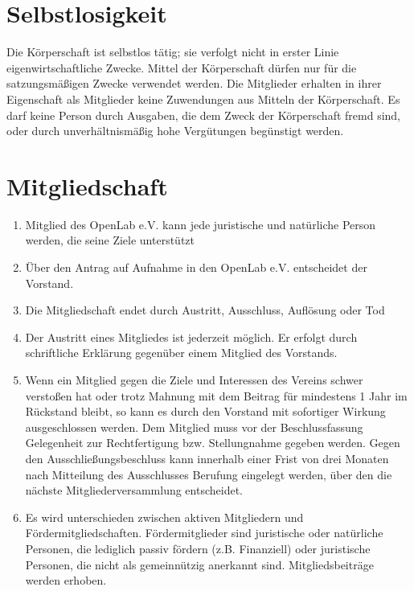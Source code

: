 \documentclass[a5paper, ngerman, 10pt]{scrreprt}
\begin{document}
\section{Selbstlosigkeit}
Die Körperschaft ist selbstlos tätig; sie verfolgt nicht in erster Linie
eigenwirtschaftliche Zwecke. Mittel der Körperschaft dürfen nur für die
satzungsmäßigen Zwecke verwendet werden. Die Mitglieder erhalten in ihrer
Eigenschaft als Mitglieder keine Zuwendungen aus Mitteln der Körperschaft. Es
darf keine Person durch Ausgaben, die dem Zweck der Körperschaft fremd sind,
oder durch unverhältnismäßig hohe Vergütungen begünstigt werden.


\section{Mitgliedschaft}
\begin{enumerate}[(1)]
    \item Mitglied des OpenLab e.V. kann jede juristische und natürliche Person
        werden, die seine Ziele unterstützt
    \item Über den Antrag auf Aufnahme in den OpenLab e.V. entscheidet der
        Vorstand.
    \item Die Mitgliedschaft endet durch Austritt, Ausschluss, Auflösung oder
        Tod
    \item Der Austritt eines Mitgliedes ist jederzeit möglich. Er erfolgt durch
        schriftliche Erklärung gegenüber einem Mitglied des Vorstands.
    \item Wenn ein Mitglied gegen die Ziele und Interessen des Vereins schwer
        verstoßen hat oder trotz Mahnung mit dem Beitrag für mindestens 1 Jahr
        im Rückstand bleibt, so kann es durch den Vorstand mit sofortiger
        Wirkung ausgeschlossen werden. Dem Mitglied muss vor der
        Beschlussfassung Gelegenheit zur Rechtfertigung bzw. Stellungnahme
        gegeben werden. Gegen den Ausschließungsbeschluss kann innerhalb einer
        Frist von drei Monaten nach Mitteilung des Ausschlusses Berufung
        eingelegt werden, über den die nächste Mitgliederversammlung
        entscheidet.
    \item Es wird unterschieden zwischen aktiven Mitgliedern und
        Fördermitgliedschaften.  Fördermitglieder sind juristische oder
        natürliche Personen, die lediglich passiv fördern (z.B. Finanziell)
        oder juristische Personen, die nicht als gemeinnützig anerkannt sind.
        Mitgliedsbeiträge werden erhoben.
\end{enumerate}
\end{document}
